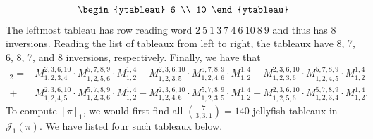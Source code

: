 \documentclass[ALCO, Unicode]{cedram}
\numberwithin{equation}{section}
\newcommand{\rstab}{\mathcal{J}}
\begin{document}
\begin{example}
\[\begin{ytableau}
6 \\
10
\end{ytableau}\]
The leftmost tableau has row reading word $2~5~1~3~7~4~6~10~8~9$ and thus has 8 inversions. Reading the list of tableaux from left to right, the tableaux have 8, 7, 6, 8, 7, and 8 inversions, respectively. Finally, we have that 
{\small 
\begin{align*}[\pi]_2 = &M_{1,2,3,4}^{2,3,6,10}\cdot M_{1,2,5,6}^{5,7,8,9}\cdot M_{1,2}^{1,4}
- M_{1,2,3,5}^{2,3,6,10}\cdot M_{1,2,4,6}^{5,7,8,9}\cdot M_{1,2}^{1,4}
+ M_{1,2,3,6}^{2,3,6,10}\cdot M_{1,2,4,5}^{5,7,8,9}\cdot M_{1,2}^{1,4}\\
+ &M_{1,2,4,5}^{2,3,6,10}\cdot M_{1,2,3,6}^{5,7,8,9}\cdot M_{1,2}^{1,4}
- M_{1,2,4,6}^{2,3,6,10}\cdot M_{1,2,3,5}^{5,7,8,9}\cdot M_{1,2}^{1,4}
+ M_{1,2,5,6}^{2,3,6,10}\cdot M_{1,2,3,4}^{5,7,8,9}\cdot M_{1,2}^{1,4}.
\end{align*}
}
To compute $[\pi]_1$, we would first find all $\binom{7}{3,3,1}=140$ jellyfish tableaux in $\rstab_1(\pi)$. We have listed four such tableaux below. 



\end{example}
\end{document}
